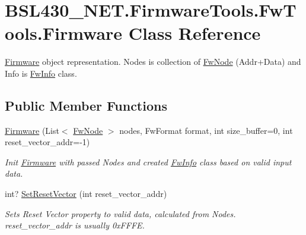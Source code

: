\hypertarget{class_b_s_l430___n_e_t_1_1_firmware_tools_1_1_fw_tools_1_1_firmware}{}\section{B\+S\+L430\+\_\+\+N\+E\+T.\+Firmware\+Tools.\+Fw\+Tools.\+Firmware Class Reference}
\label{class_b_s_l430___n_e_t_1_1_firmware_tools_1_1_fw_tools_1_1_firmware}


\mbox{\hyperlink{class_b_s_l430___n_e_t_1_1_firmware_tools_1_1_fw_tools_1_1_firmware}{Firmware}} object representation. Nodes is collection of \mbox{\hyperlink{class_b_s_l430___n_e_t_1_1_firmware_tools_1_1_fw_tools_1_1_fw_node}{Fw\+Node}} (Addr+\+Data) and Info is \mbox{\hyperlink{class_b_s_l430___n_e_t_1_1_firmware_tools_1_1_fw_tools_1_1_fw_info}{Fw\+Info}} class.  


\subsection*{Public Member Functions}
\begin{DoxyCompactItemize}
\item 
\mbox{\hyperlink{class_b_s_l430___n_e_t_1_1_firmware_tools_1_1_fw_tools_1_1_firmware_ade815c90607d3ca2499a1d192ede9362}{Firmware}} (List$<$ \mbox{\hyperlink{class_b_s_l430___n_e_t_1_1_firmware_tools_1_1_fw_tools_1_1_fw_node}{Fw\+Node}} $>$ nodes, Fw\+Format format, int size\+\_\+buffer=0, int reset\+\_\+vector\+\_\+addr=-\/1)
\begin{DoxyCompactList}\small\item\em Init \mbox{\hyperlink{class_b_s_l430___n_e_t_1_1_firmware_tools_1_1_fw_tools_1_1_firmware}{Firmware}} with passed Nodes and created \mbox{\hyperlink{class_b_s_l430___n_e_t_1_1_firmware_tools_1_1_fw_tools_1_1_fw_info}{Fw\+Info}} class based on valid input data. \end{DoxyCompactList}\item 
int? \mbox{\hyperlink{class_b_s_l430___n_e_t_1_1_firmware_tools_1_1_fw_tools_1_1_firmware_a554bd13e5c9a17d68c017d20e1d391fa}{Set\+Reset\+Vector}} (int reset\+\_\+vector\+\_\+addr)
\begin{DoxyCompactList}\small\item\em Sets Reset Vector property to valid data, calculated from Nodes. reset\+\_\+vector\+\_\+addr is usually 0x\+F\+F\+FE. \end{DoxyCompactList}\end{DoxyCompactItemize}
